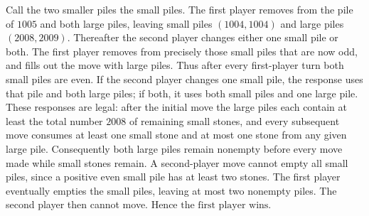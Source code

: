 Call the two smaller piles the small piles. The first player removes from the pile of $1005$ and both large piles, leaving small piles $(1004,1004)$ and large piles $(2008,2009)$.
Thereafter the second player changes either one small pile or both. The first player removes from precisely those small piles that are now odd, and fills out the move with large piles. Thus after every first-player turn both small piles are even. If the second player changes one small pile, the response uses that pile and both large piles; if both, it uses both small piles and one large pile.
These responses are legal: after the initial move the large piles each contain at least the total number $2008$ of remaining small stones, and every subsequent move consumes at least one small stone and at most one stone from any given large pile. Consequently both large piles remain nonempty before every move made while small stones remain. A second-player move cannot empty all small piles, since a positive even small pile has at least two stones. The first player eventually empties the small piles, leaving at most two nonempty piles. The second player then cannot move. Hence $\boxed{\text{the first player wins}}$.
